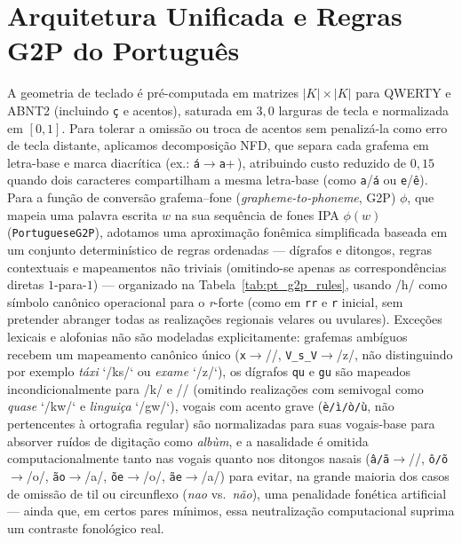 \documentclass[a4paper, twocolumn, 11pt, twoside]{article}
\begin{document}
\section{Arquitetura Unificada e Regras G2P do Português}
\label{sec:arq}
A geometria de teclado é pré-computada em matrizes $|K|\times|K|$ para QWERTY e ABNT2 (incluindo \texttt{ç} e acentos), saturada em $3{,}0$ larguras de tecla e normalizada em $[0,1]$. Para tolerar a omissão ou troca de acentos sem penalizá-la como erro de tecla distante, aplicamos decomposição NFD, que separa cada grafema em letra-base e marca diacrítica (ex.: \texttt{á}$\rightarrow$\texttt{a}+\,\textasciiacute), atribuindo custo reduzido de $0{,}15$ quando dois caracteres compartilham a mesma letra-base (como \texttt{a}/\texttt{á} ou \texttt{e}/\texttt{ê}). Para a função de conversão grafema--fone (\textit{grapheme-to-phoneme}, G2P) $\phi$, que mapeia uma palavra escrita $w$ na sua sequência de fones IPA $\phi(w)$ (\texttt{PortugueseG2P}), adotamos uma aproximação fonêmica simplificada baseada em um conjunto determinístico de regras ordenadas --- dígrafos e ditongos, regras contextuais e mapeamentos não triviais (omitindo-se apenas as correspondências diretas $1$-para-$1$) --- organizado na Tabela~\ref{tab:pt_g2p_rules}, usando /h/ como símbolo canônico operacional para o \textit{r}-forte (como em \texttt{rr} e \texttt{r} inicial, sem pretender abranger todas as realizações regionais velares ou uvulares). Exceções lexicais e alofonias não são modeladas explicitamente: grafemas ambíguos recebem um mapeamento canônico único (\texttt{x}$\rightarrow$/\textesh/, \texttt{V\_s\_V}$\rightarrow$/z/, não distinguindo por exemplo \textit{táxi} `/ks/` ou \textit{exame} `/z/`), os dígrafos \texttt{qu} e \texttt{gu} são mapeados incondicionalmente para /k/ e // (omitindo realizações com semivogal como \textit{quase} `/kw/` e \textit{linguiça} `/gw/`), vogais com acento grave (\texttt{è/ì/ò/ù}, não pertencentes à ortografia regular) são normalizadas para suas vogais-base para absorver ruídos de digitação como \textit{albùm}, e a nasalidade é omitida computacionalmente tanto nas vogais quanto nos ditongos nasais (\texttt{â/ã}$\rightarrow$/\textturna/, \texttt{ô/õ}$\rightarrow$/o/, \texttt{ão}$\rightarrow$/a\textupsilon/, \texttt{õe}$\rightarrow$/o\textsci/, \texttt{ãe}$\rightarrow$/a\textsci/) para evitar, na grande maioria dos casos de omissão de til ou circunflexo (\textit{nao} vs.\ \textit{não}), uma penalidade fonética artificial --- ainda que, em certos pares mínimos, essa neutralização computacional suprima um contraste fonológico real.
\end{document}
